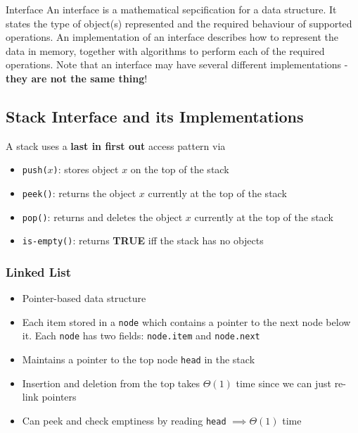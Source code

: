 \documentclass[11pt]{article}
\begin{document}
\begin{definitionbox}{Interface}
    An interface is a mathematical sepcification for a data structure. It states the type of
    object(s) represented and the required behaviour of supported operations. An implementation of
    an interface describes how to represent the data in memory, together with algorithms to perform
    each of the required operations. Note that an interface may have several different
    implementations - \textbf{they are not the same thing}!
\end{definitionbox}

\subsection{Stack Interface and its Implementations}
A stack uses a \textbf{last in first out} access pattern via
\begin{itemize}
    \item \texttt{push($x$)}: stores object $x$ on the top of the stack
    \item \texttt{peek()}: returns the object $x$ currently at the top of the stack
    \item \texttt{pop()}: returns and deletes the object $x$ currently at the top of the stack
    \item \texttt{is-empty()}: returns \textbf{TRUE} iff the stack has no objects
\end{itemize}

\subsubsection{Linked List}
\begin{itemize}
    \item Pointer-based data structure
    \item Each item stored in a \texttt{node} which contains a pointer to the next node below it.
        Each \texttt{node} has two fields: \texttt{node.item} and \texttt{node.next}
    \item Maintains a pointer to the top node \texttt{head} in the stack
    \item Insertion and deletion from the top takes $\Theta(1)$ time since we can just re-link
        pointers
    \item Can peek and check emptiness by reading \texttt{head} $\implies \Theta(1)$ time
\end{itemize}
\end{document}
